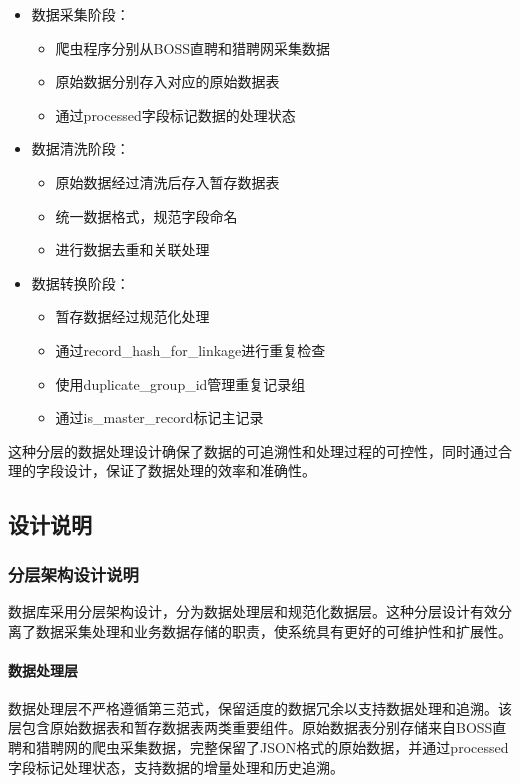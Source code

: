 \begin{itemize}
    \item 数据采集阶段：
    \begin{itemize}
        \item 爬虫程序分别从BOSS直聘和猎聘网采集数据
        \item 原始数据分别存入对应的原始数据表
        \item 通过processed字段标记数据的处理状态
    \end{itemize}
    
    \item 数据清洗阶段：
    \begin{itemize}
        \item 原始数据经过清洗后存入暂存数据表
        \item 统一数据格式，规范字段命名
        \item 进行数据去重和关联处理
    \end{itemize}
    
    \item 数据转换阶段：
    \begin{itemize}
        \item 暂存数据经过规范化处理
        \item 通过record\_hash\_for\_linkage进行重复检查
        \item 使用duplicate\_group\_id管理重复记录组
        \item 通过is\_master\_record标记主记录
    \end{itemize}
\end{itemize}

这种分层的数据处理设计确保了数据的可追溯性和处理过程的可控性，同时通过合理的字段设计，保证了数据处理的效率和准确性。
\subsection{设计说明}

\subsubsection{分层架构设计说明}

数据库采用分层架构设计，分为数据处理层和规范化数据层。这种分层设计有效分离了数据采集处理和业务数据存储的职责，使系统具有更好的可维护性和扩展性。

\paragraph{数据处理层}
数据处理层不严格遵循第三范式，保留适度的数据冗余以支持数据处理和追溯。该层包含原始数据表和暂存数据表两类重要组件。原始数据表分别存储来自BOSS直聘和猎聘网的爬虫采集数据，完整保留了JSON格式的原始数据，并通过processed字段标记处理状态，支持数据的增量处理和历史追溯。


